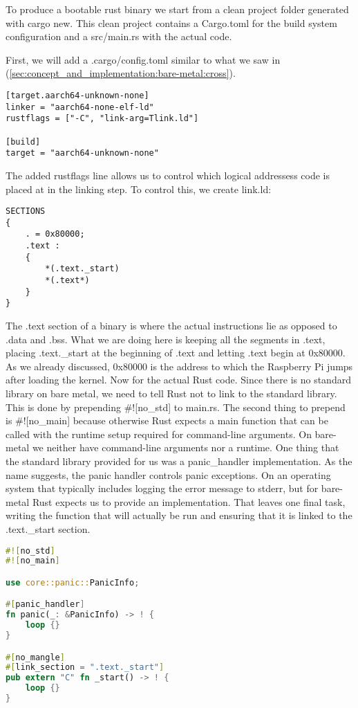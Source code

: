 To produce a bootable rust binary we start from a clean project folder generated with cargo new.
This clean project contains a Cargo.toml for the build system configuration and a src/main.rs with the actual code.

First, we will add a .cargo/config.toml similar to what we saw in  (\ref{sec:concept_and_implementation:bare-metal:cross}).
\begin{lstlisting}
[target.aarch64-unknown-none]
linker = "aarch64-none-elf-ld"
rustflags = ["-C", "link-arg=Tlink.ld"]
    
[build]
target = "aarch64-unknown-none"
\end{lstlisting}
The added rustflags line allows us to control which logical addressess code is placed at in the linking step.
To control this, we create link.ld:
\begin{lstlisting}
SECTIONS
{
    . = 0x80000;
    .text :
    {
        *(.text._start)
        *(.text*)
    }
}
\end{lstlisting}
The .text section of a binary is where the actual instructions lie as opposed to .data and .bss.
What we are doing here is keeping all the segments in .text, placing .text.\_start at the beginning of .text and letting .text begin at 0x80000.
As we already discussed, 0x80000 is the address to which the Raspberry Pi jumps after loading the kernel.
Now for the actual Rust code. Since there is no standard library on bare metal, we need to tell Rust not to link to the standard library.
This is done by prepending \#![no\_std] to main.rs.
The second thing to prepend is \#![no\_main] because otherwise Rust expects a main function that can be called with the runtime setup required for command-line arguments.
On bare-metal we neither have command-line arguments nor a runtime.
One thing that the standard library provided for us was a panic\_handler implementation.
As the name suggests, the panic handler controls panic exceptions.
On an operating system that typically includes logging the error message to stderr, but for bare-metal Rust expects us to provide an implementation.
That leaves one final task, writing the function that will actually be run and ensuring that it is linked to the .text.\_start section.
\begin{lstlisting}[language=Rust,style=colouredRust]
#![no_std]
#![no_main]

use core::panic::PanicInfo;

#[panic_handler]
fn panic(_: &PanicInfo) -> ! {
    loop {}
}

#[no_mangle]
#[link_section = ".text._start"]
pub extern "C" fn _start() -> ! {
	loop {}
}
\end{lstlisting}

